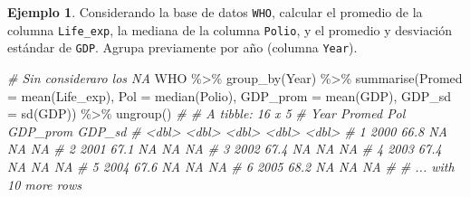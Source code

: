 \documentclass[
]{article}
\newenvironment{Shaded}{\begin{snugshade}}{\end{snugshade}}
\newcommand{\AttributeTok}[1]{\textcolor[rgb]{0.77,0.63,0.00}{#1}}
\newcommand{\CommentTok}[1]{\textcolor[rgb]{0.56,0.35,0.01}{\textit{#1}}}
\newcommand{\FunctionTok}[1]{\textcolor[rgb]{0.00,0.00,0.00}{#1}}
\newcommand{\NormalTok}[1]{#1}
\newcommand{\SpecialCharTok}[1]{\textcolor[rgb]{0.00,0.00,0.00}{#1}}
\theoremstyle{definition}
\theoremstyle{definition}
\newtheorem{example}{Ejemplo}[section]
\theoremstyle{definition}
\theoremstyle{definition}
\theoremstyle{remark}
\begin{document}
\begin{example}

Considerando la base de datos \texttt{WHO}, calcular el promedio de la columna \texttt{Life\_exp}, la mediana de la columna \texttt{Polio}, y el promedio y desviación estándar de \texttt{GDP}. Agrupa previamente por año (columna \texttt{Year}).

\begin{Shaded}
\begin{Highlighting}[]
\CommentTok{\# Sin consideraro los NA}
\NormalTok{WHO }\SpecialCharTok{\%\textgreater{}\%} 
  \FunctionTok{group\_by}\NormalTok{(Year) }\SpecialCharTok{\%\textgreater{}\%} 
  \FunctionTok{summarise}\NormalTok{(}\AttributeTok{Promed =} \FunctionTok{mean}\NormalTok{(Life\_exp),}
            \AttributeTok{Pol =} \FunctionTok{median}\NormalTok{(Polio),}
            \AttributeTok{GDP\_prom =} \FunctionTok{mean}\NormalTok{(GDP),}
            \AttributeTok{GDP\_sd =} \FunctionTok{sd}\NormalTok{(GDP)) }\SpecialCharTok{\%\textgreater{}\%} 
  \FunctionTok{ungroup}\NormalTok{()}
\CommentTok{\# \# A tibble: 16 x 5}
\CommentTok{\#    Year Promed   Pol GDP\_prom GDP\_sd}
\CommentTok{\#   \textless{}dbl\textgreater{}  \textless{}dbl\textgreater{} \textless{}dbl\textgreater{}    \textless{}dbl\textgreater{}  \textless{}dbl\textgreater{}}
\CommentTok{\# 1  2000   66.8    NA       NA     NA}
\CommentTok{\# 2  2001   67.1    NA       NA     NA}
\CommentTok{\# 3  2002   67.4    NA       NA     NA}
\CommentTok{\# 4  2003   67.4    NA       NA     NA}
\CommentTok{\# 5  2004   67.6    NA       NA     NA}
\CommentTok{\# 6  2005   68.2    NA       NA     NA}
\CommentTok{\# \# ... with 10 more rows}
\end{Highlighting}
\end{Shaded}


\end{example}
\end{document}
